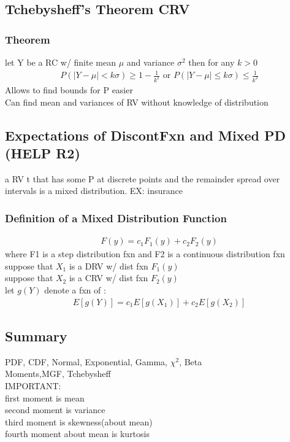 \documentclass[12pt]{article}
\begin{document}
\subsection{Tchebysheff's Theorem CRV}
    \subsubsection{Theorem}
        let Y be a RC w/ finite mean $ \mu $ and variance $ \sigma^2 $
        then for any $ k>0 $
        \begin{align*}
            P(|Y-\mu|<k\sigma) \ge 1 - \frac{1}{k^2} \text{ or }
            P(|Y-\mu|\le k\sigma) \le \frac{1}{k^2}
        \end{align*}
        Allows to find bounds for P easier \\
        Can find mean and variances of RV without knowledge of distribution
\subsection{Expectations of DiscontFxn and Mixed PD (HELP R2)}
    a RV t that has some P at discrete points and the remainder 
    spread over intervals is a mixed distribution. EX: insurance
    \subsubsection{Definition of a Mixed Distribution Function}
        \begin{align*}
            F(y) = c_{1}F_{1}(y) + c_{2}F_{2}(y)
        \end{align*}
        where F1 is a step distribution fxn and F2 is a 
        continuous distribution fxn\\
        suppose that $ X_{1} $ is a DRV w/ dist fxn $ F_{1}(y) $\\
        suppose that $ X_{2} $ is a CRV w/ dist fxn $ F_{2}(y) $\\
        let $ g(Y) $ denote a fxn of :
        \begin{align*}
            E[g(Y)] =c_{1}E[g(X_{1})] + c_{2}E[g(X_{2})]
        \end{align*}
\subsection{Summary}
    PDF, CDF, Normal, Exponential, Gamma, $ \chi^2 $, Beta\\
    Moments,MGF, Tchebysheff\\
    IMPORTANT:\\
    first moment is mean\\
    second moment is variance\\
    third moment is skewness(about mean)\\
    fourth moment about mean is kurtosis
\end{document}
